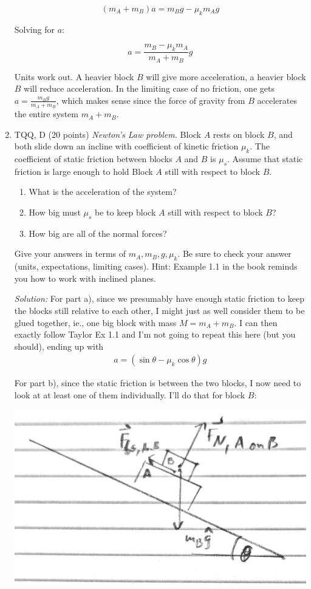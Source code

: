 \documentclass[12pt]{article}
\newcommand{\soln}[1] {\textit{Solution:} #1}
\begin{document}
\begin{enumerate}
{$$(m_A + m_B) a = m_B g - \mu_k m_A g$$

Solving for $a$:

$$ a = \frac{m_B - \mu_k m_A}{m_A + m_B} g$$

Units work out. A heavier block $B$ will give more acceleration, a heavier block $B$ will reduce acceleration. In the limiting case of no friction, one gets $a = \frac{m_Bg}{m_A + m_B}$, which makes sense since the force of gravity from $B$ accelerates the entire system $m_A + m_B$.

}

\item TQQ, D (20 points) \textit{Newton’s Law problem.}  Block $A$ rests on block $B$, and both slide down an incline with coefficient of kinetic friction $\mu_k$.  The coefficient of static friction between blocks $A$ and $B$ is $\mu_s$. Assume that static friction is large enough to hold Block $A$ still with respect to block $B$.
\begin{enumerate}
  \item	What is the acceleration of the system?
\item	How big must $\mu_s$ be to keep block $A$ still with respect to block $B$?
\item	How big are all of the normal forces?
\end{enumerate}
 Give your answers in terms of $m_A, m_B, g, \mu_k$.  Be sure to check your answer (units, expectations, limiting cases).  Hint:  Example 1.1 in the book reminds you how to work with inclined planes.

 \soln{
  For part a), since we presumably have enough static friction to keep the blocks still relative to each other, I might just as well consider them to be glued together, ie., one big block with mass $M = m_A + m_B$. I can then exactly follow Taylor Ex 1.1 and I'm not going to repeat this here (but you should), ending up with
\begin{align}
a = (\sin\theta - \mu_k\cos\theta) g
\end{align}

For part b), since the static friction is between the two blocks, I now need to look at at least one of them individually. I'll do that for block $B$:

\centerline{\includegraphics[width=.4\textwidth]{fbd2.png}}

}
\end{enumerate}
\end{document}
